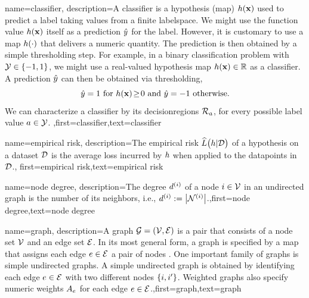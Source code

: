 {
	name={classifier},
	description={A classifier is a \gls{hypothesis} (map) $h({\bf x})$ 
		used to predict a \gls{label} taking values from a finite \gls{labelspace}. We might use the 
		function value $h({\bf x})$ itself as a \gls{prediction} $\hat{y}$ for 
		the \gls{label}. However, it is customary to use a map $h(\cdot)$ that delivers 
		a numeric quantity. The \gls{prediction} is then obtained by a simple thresholding step. 
		For example, in a binary \gls{classification} problem with \label{labelspace} $\mathcal{Y} \in  \{ -1,1\}$, 
		we might use a real-valued \gls{hypothesis} map $h({\bf x}) \in \mathbb{R}$ 
		as a classifier. A \gls{prediction} $\hat{y}$ can then be obtained via thresholding,  
		 \begin{equation} 
		 	\label{equ_def_threshold_bin_classifier_dict}
		 	\hat{y} =1   \mbox{ for } h({\bf x})\!\geq\!0 \mbox{ and } 	\hat{y} =-1  \mbox{ otherwise.}
	 		\end{equation}
 		We can characterize a classifier by its \gls{decisionregion}s $\mathcal{R}_{a}$, for 
 		every possible \gls{label} value $a \in \mathcal{Y}$. },first={classifier},text={classifier} 
}

{name={empirical risk},
  description={The empirical \gls{risk} $\widehat{L}\big(h|\mathcal{D}\big)$ 
  	of a \gls{hypothesis} on a \gls{dataset} $\mathcal{D}$ is the average \gls{loss} incurred 
  	by $h$ when applied to the \gls{datapoint}s in $\mathcal{D}$.},
  first={empirical risk},text={empirical risk} 
}

{name={node degree},
	description={The degree $d^{(i)}$ of a node $i \in \mathcal{V}$ 
		in an undirected \gls{graph} is the number of its \gls{neighbors}, i.e., $d^{(i)} := \big|\mathcal{N}^{(i)}\big|$.},first={node degree},text={node degree} 
}

{name={graph},
	description={A graph $\mathcal{G} = \left( \mathcal{V},\mathcal{E} \right)$ is a pair that consists of 
		a node set $\mathcal{V}$ and an edge set $\mathcal{E}$. In its most general form, a graph is 
		specified by a map that assigns each edge $e \in \mathcal{E}$ a pair of nodes \cite{RockNetworks}. 
		One important family of graphs is simple undirected graphs. A simple undirected graph 
		is obtained by identifying each edge $e \in \mathcal{E}$ with two different nodes $\{i,i'\}$. 
		Weighted graphs also specify numeric \gls{weights} $A_{e}$ for each 
		edge $e \in \mathcal{E}$.},first={graph},text={graph} 
}

